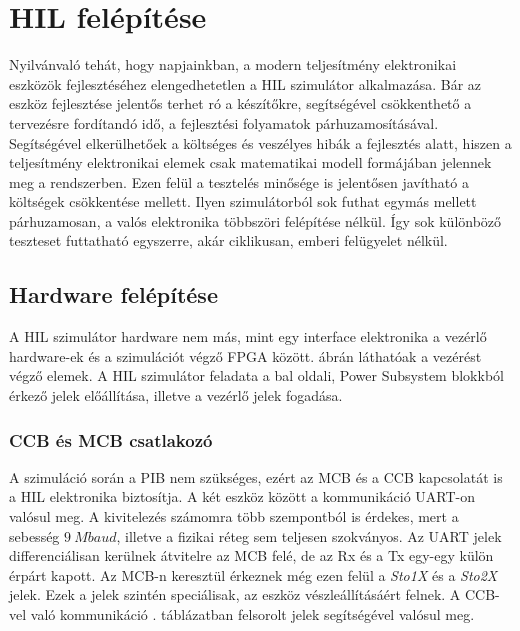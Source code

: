 \chapter{HIL felépítése}

Nyilvánvaló tehát, hogy napjainkban, a modern teljesítmény elektronikai eszközök fejlesztéséhez elengedhetetlen a HIL szimulátor alkalmazása. Bár az eszköz fejlesztése jelentős terhet ró a készítőkre, segítségével csökkenthető a tervezésre fordítandó idő, a fejlesztési folyamatok párhuzamosításával. Segítségével elkerülhetőek a költséges és veszélyes hibák a fejlesztés alatt, hiszen a teljesítmény elektronikai elemek csak matematikai modell formájában jelennek meg a rendszerben. Ezen felül a tesztelés minősége is jelentősen javítható a költségek csökkentése mellett. Ilyen szimulátorból sok futhat egymás mellett párhuzamosan, a valós elektronika többszöri felépítése nélkül. Így sok különböző teszteset futtatható egyszerre, akár ciklikusan, emberi felügyelet nélkül. \cite{dirac}

\section{Hardware felépítése}

A HIL szimulátor hardware nem más, mint egy interface elektronika a vezérlő hardware-ek és a szimulációt végző FPGA között.  ábrán láthatóak a vezérést végző elemek. A HIL szimulátor feladata a bal oldali, Power Subsystem blokkból érkező jelek előállítása, illetve a vezérlő jelek fogadása.

\subsection{CCB és MCB csatlakozó}
A szimuláció során a PIB nem szükséges, ezért az MCB és a CCB kapcsolatát is a HIL elektronika biztosítja. A két eszköz között a kommunikáció UART-on valósul meg. A kivitelezés számomra több szempontból is érdekes, mert a sebesség $9\ Mbaud$, illetve a fizikai réteg sem teljesen szokványos. Az UART jelek differenciálisan kerülnek átvitelre az MCB felé, de az Rx és a Tx egy-egy külön érpárt kapott. Az MCB-n keresztül érkeznek még ezen felül a \emph{Sto1X} és a \emph{Sto2X} jelek. Ezek a jelek szintén speciálisak, az eszköz vészleállításáért felnek. A CCB-vel való kommunikáció . táblázatban felsorolt jelek segítségével valósul meg. 

